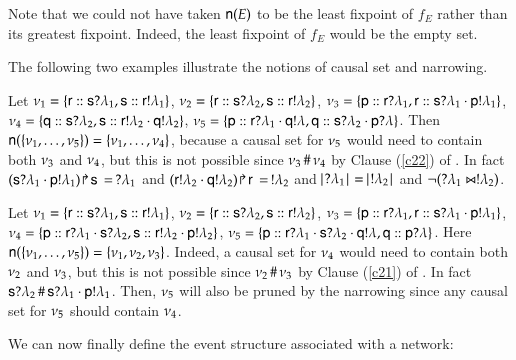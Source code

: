 Note that we could not have taken ${\sf n}(E)$ to be the least
fixpoint of $f_E$ rather than its greatest fixpoint.
Indeed, the least fixpoint of $f_E$ would be the empty set. 


\begin{example} 
\label{ex-narrowing}
The following two examples illustrate the notions of causal set
and narrowing. 

Let $\nu_1=\{{\sf r}:: {\sf s}?\lambda_1, {\sf s}:: {\sf r}!\lambda_1\}$,
$\nu_2=\{{\sf r}:: {\sf s}?\lambda_2, {\sf s}:: {\sf r}!\lambda_2\}$,
$\nu_3=\{{\sf p}:: {\sf r}?\lambda_1,{\sf r}:: {\sf s}?\lambda_1\cdot{\sf p}!\lambda_1\}$,
$\nu_4=\{{\sf q}:: {\sf s}?\lambda_2,{\sf s}:: {\sf r}!\lambda_2\cdot{\sf q}!\lambda_2\}$,
$\nu_5=\{{\sf p}:: {\sf r}?\lambda_1\cdot{\sf q}!\lambda,
  {\sf q}:: {\sf s}?\lambda_2\cdot{\sf p}?\lambda\}$.  Then 
${\sf n}(\{\nu_1,\ldots,\nu_5\})= \{\nu_1,\ldots,\nu_4\}$,
 because a causal set for $\nu_5$ would need to contain both
$\nu_3$ and $\nu_4$, but this is not possible since
$\nu_3 \,\#\, \nu_4$   
by Clause (\ref{c22}) of
. In fact $({\sf s}?\lambda_1 \cdot{\sf p}!\lambda_1) \! \Rsh \! {\sf s}\, = \,?\lambda_1$ and
  $({\sf r}!\lambda_2  \cdot{\sf q}!\lambda_2) \! \Rsh \! {\sf r}\, = \,!\lambda_2$ and $\cardin{?\la_1} =
  \cardin{!\la_2}$ and $\neg(?\lambda_1\Join !\lambda_2)$.


  Let $\nu_1=\{{\sf r}:: {\sf s}?\lambda_1, {\sf s}:: {\sf r}!\lambda_1\}$,
  $\nu_2=\{{\sf r}:: {\sf s}?\lambda_2, {\sf s}:: {\sf r}!\lambda_2\}$,
  $\nu_3=\{{\sf p}:: {\sf r}?\lambda_1,{\sf r}:: {\sf s}?\lambda_1\cdot{\sf p}!\lambda_1\}$,
  $\nu_4=\{{\sf p}:: {\sf r}?\lambda_1\cdot{\sf s}?\lambda_2,{\sf s}:: {\sf r}!\lambda_2\cdot{\sf p}!\lambda_2\}$,
  $\nu_5=\{{\sf p}:: {\sf r}?\lambda_1\cdot{\sf s}?\lambda_2\cdot{\sf q}!\lambda,{\sf q}:: {\sf p}?\lambda\}$.
  Here ${\sf n}(\{\nu_1,\ldots,\nu_5\})=
  \{\nu_1,\nu_2,\nu_3\}$. Indeed, a causal set for
  $\nu_4$ would need to contain both $\nu_2$ and $\nu_3$, but
  this is not possible since $\nu_2 \,\#\, \nu_3$  by Clause
  (\ref{c21}) of .  In fact
  ${\sf s}?\lambda_2\,\#\,{\sf s}?\lambda_1  \cdot{\sf p}!\lambda_1$.  Then, 
  $\nu_5$   %
  will  also
  be pruned by the narrowing since any causal set for
  $\nu_5$ should contain $\nu_4$.
\end{example}

We can now  finally  define the event structure associated with a  network:


